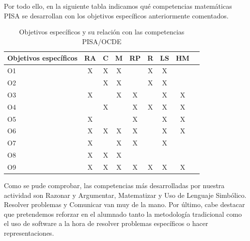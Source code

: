 \documentclass[../main.tex]{memoir}
\begin{document}
Por todo ello, en la siguiente tabla indicamos qué competencias matemáticas PISA se desarrollan con los objetivos específicos anteriormente comentados.

\begin{table}[H]
	\centering
	\begin{tabular}{lcccccccc}
		\hline
		\toprule
		\textbf{Objetivos específicos} & \textbf{RA} & \textbf{C} & \textbf{M} & \textbf{RP} & \textbf{R} & \textbf{LS} & \textbf{HM} \\ 
		\midrule
		O1                             & X           & X          & X          &             & X          & X           &             \\ \hline
		O2                             &             & X          & X          &             & X          & X           &             \\ \hline
		O3                             & X           &            & X          & X           &            & X           & X           \\ \hline
		O4                             &             & X          &           & X           & X          & X           & X           \\ \hline
		O5                             & X           &            &          & X           &            & X           & X           \\ \hline
		O6                             & X           & X          & X          & X           &            & X           & X           \\ \hline
		O7                             & X           &            & X          & X           &            & X           &             \\ \hline
		O8                             & X           & X          & X          &             &            &             &             \\ \hline
		O9                             & X           & X          & X          & X           & X          & X           & X           \\ 
		\bottomrule
	\end{tabular}
	\caption{Objetivos específicos y su relación con las competencias PISA/OCDE}
	\label{tab:obj-pisa}
\end{table}

Como se pude comprobar, las competencias más desarrolladas por nuestra actividad son Razonar y Argumentar, Matematizar y Uso de Lenguaje Simbólico. Resolver problemas y Comunicar van muy de la mano. Por último, cabe destacar que pretendemos reforzar en el alumnado tanto la metodología tradicional como el uso de software a la hora de resolver problemas específicos o hacer representaciones.
\end{document}
